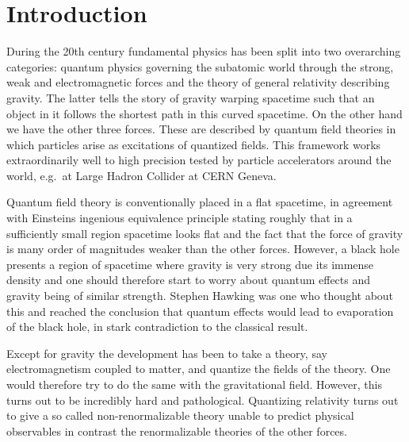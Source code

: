 \chapter{Introduction}
During the 20th century fundamental physics has been split into two overarching categories: quantum physics governing the subatomic world through the strong, weak and electromagnetic forces and the theory of general relativity describing gravity. The latter tells the story of gravity warping spacetime such that an object in it follows the shortest path in this curved spacetime. On the other hand we have the other three forces. These are described by quantum field theories in which particles arise as excitations of quantized fields. This framework works extraordinarily well to high precision tested by particle accelerators around the world, e.g.\ at Large Hadron Collider at CERN Geneva.


Quantum field theory is conventionally placed in a flat spacetime, in agreement with Einsteins ingenious equivalence principle stating roughly that in a sufficiently small region spacetime looks flat and the fact that the force of gravity is many order of magnitudes weaker than the other forces. However, a black hole presents a region of spacetime where gravity is very strong due its immense density and one should therefore start to worry about quantum effects and gravity being of similar strength. Stephen Hawking was one who thought about this and reached the conclusion that quantum effects would lead to evaporation of the black hole, in stark contradiction to the classical result.

Except for gravity the development has been to take a theory, say electromagnetism coupled to matter, and quantize the fields of the theory. One would therefore try to do the same with the gravitational field. However, this turns out to be incredibly hard and pathological. Quantizing relativity turns out to give a so called non-renormalizable theory unable to predict physical observables in contrast the renormalizable theories of the other forces. 

